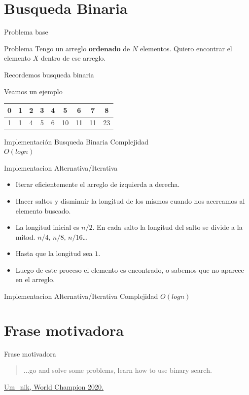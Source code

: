 \documentclass{beamer}
\begin{document}
\section{Busqueda Binaria}
\begin{frame}{Problema base}
    \begin{block}{Problema}
        Tengo un arreglo $\bm{ordenado}$ de $N$ elementos. 
        Quiero encontrar el elemento $X$ dentro de ese arreglo.
    \end{block}
    Recordemos busqueda binaria
\end{frame}
\begin{frame}{Veamos un ejemplo}
    \centering
    \begin{tabular}{| c | c | c | c | c | c | c | c | c |}
        0 & 1 & 2 & 3 & 4 & 5 & 6 & 7 & 8 \\
        \hline
        1 & 1 & 4 & 5 & 6 & 10 & 11 & 11 & 23 \\
        \hline
    \end{tabular}
\end{frame}
\begin{frame}{Implementación Busqueda Binaria}
    \busquedaBinariaNormal
    \centering
    Complejidad\\
    \pause
    $O(log n)$
\end{frame}

\begin{frame}{Implementacion Alternativa/Iterativa}
    \begin{itemize}
        \item Iterar eficientemente el arreglo de izquierda a derecha.
        \item Hacer saltos y disminuir la longitud de los mismos cuando nos acercamos al elemento buscado.
        \item La longitud inicial es $n/2$. En cada salto la longitud del salto se divide a la mitad. $n/4$, $n/8$, $n/16$\dots
        \item Hasta que la longitud sea $1$.
        \item Luego de este proceso el elemento es encontrado, o sabemos que no aparece en el arreglo.
    \end{itemize}
\end{frame}

\begin{frame}{Implementacion Alternativa/Iterativa}
    \busquedaBinariaTricky
    Complejidad $O(log n)$
\end{frame}

\section{Frase motivadora}
\begin{frame}{Frase motivadora}
  \begin{quote}
    ...go and solve some problems, learn how to use binary search.
  \end{quote}
  \href{https://codeforces.com/blog/entry/92248}{Um\_nik, World Champion 2020.}
\end{frame}
\end{document}
